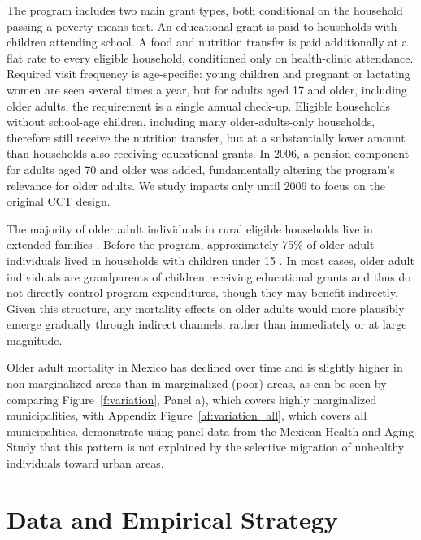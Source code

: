 \documentclass[12pt]{article}
\begin{document}
\p The program includes two main grant types, both conditional on the household passing a poverty means test. An educational grant is paid to households with children attending school. A food and nutrition transfer is paid additionally at a flat rate to every eligible household, conditioned only on health-clinic attendance. Required visit frequency is age-specific: young children and pregnant or lactating women are seen several times a year, but for adults aged 17 and older, including older adults, the requirement is a single annual check-up. Eligible households without school-age children, including many older-adults-only households, therefore still receive the nutrition transfer, but at a substantially lower amount than households also receiving educational grants. In 2006, a pension component for adults aged 70 and older was added, fundamentally altering the program's relevance for older adults. We study impacts only until 2006 to focus on the original CCT design.


\p The majority of older adult individuals in rural eligible households live in extended families \citep{BehrmanParker2013Demography}. Before the program, approximately 75\% of older adult individuals lived in households with children under 15 \citep{BehrmanParker2013Demography}. In most cases, older adult individuals are grandparents of children receiving educational grants and thus do not directly control program expenditures, though they may benefit indirectly. Given this structure, any mortality effects on older adults would more plausibly emerge gradually through indirect channels, rather than immediately or at large magnitude.

\p Older adult mortality in Mexico has declined over time and is slightly higher in non-marginalized areas than in marginalized (poor) areas, as can be seen by comparing Figure~\ref{f:variation}, Panel a), which covers highly marginalized municipalities, with Appendix Figure~\ref{af:variation_all}, which covers all municipalities. \cite{BeltranSanchezWong2025CSP} demonstrate using panel data from the Mexican Health and Aging Study that this pattern is not explained by the selective migration of unhealthy individuals toward urban areas.


\section{Data and Empirical Strategy}\label{s:data}
\end{document}
